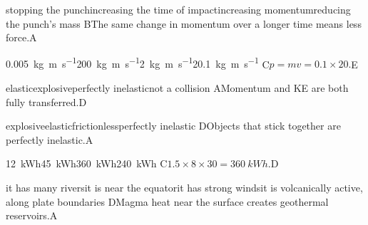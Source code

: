 \begin{gradebody}
{stopping the punch}{increasing the time of impact}{increasing momentum}{reducing the punch's mass}
{B}{The same change in momentum over a longer time means less force.}{A}

{\SI{0.005}{\kilogram\meter\per\second}}{\SI{200}{\kilogram\meter\per\second}}{\SI{2}{\kilogram\meter\per\second}}{\SI{20.1}{\kilogram\meter\per\second}}
{C}{$p = mv = 0.1 \times 20$.}{E}

{elastic}{explosive}{perfectly inelastic}{not a collision}
{A}{Momentum and KE are both fully transferred.}{D}

{explosive}{elastic}{frictionless}{perfectly inelastic}
{D}{Objects that stick together are perfectly inelastic.}{A}

{\SI{12}{kWh}}{\SI{45}{kWh}}{\SI{360}{kWh}}{\SI{240}{kWh}}
{C}{$1.5 \times 8 \times 30 = \SI{360}{kWh}$.}{D}

{it has many rivers}{it is near the equator}{it has strong winds}{it is volcanically active, along plate boundaries}
{D}{Magma heat near the surface creates geothermal reservoirs.}{A}

\end{gradebody}
\probstats
